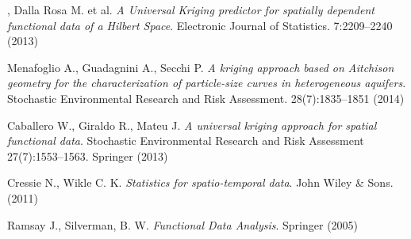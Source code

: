 \documentclass[a4paper,11pt,twoside,openright]{book}							%
\begin{document}
\begin{thebibliography}{99}
, Dalla Rosa M. et al. \emph{A Universal Kriging predictor for spatially dependent functional data of a Hilbert Space}. Electronic Journal of Statistics. 7:2209--2240 (2013)

Menafoglio A., Guadagnini A., Secchi P. \emph{A kriging approach based on Aitchison geometry for the characterization of particle-size curves in heterogeneous aquifers}. Stochastic Environmental Research and Risk Assessment. 28(7):1835--1851 (2014)

Caballero W., Giraldo R., Mateu J. \emph{A universal kriging approach for spatial functional data}. Stochastic Environmental Research and Risk Assessment 27(7):1553--1563. Springer (2013) 

Cressie N., Wikle C. K. \emph{Statistics for spatio-temporal data}. John Wiley \& Sons. (2011)

Ramsay J., Silverman, B. W. \emph{Functional Data Analysis}. Springer (2005)

\end{thebibliography}
\end{document}
